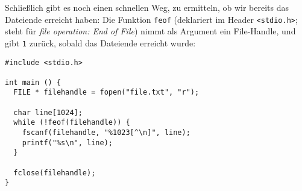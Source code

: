 Schließlich gibt es noch einen schnellen Weg, zu ermitteln, ob wir bereits das Dateiende erreicht haben: Die Funktion \texttt{feof} (deklariert im Header \texttt{<stdio.h>}; steht für \emph{file operation: End of File}) nimmt als Argument ein File-Handle, und gibt \texttt{1} zurück, sobald das Dateiende erreicht wurde:

\begin{codebox}
\begin{verbatim}
#include <stdio.h>

int main () {
  FILE * filehandle = fopen("file.txt", "r");

  char line[1024];
  while (!feof(filehandle)) {
    fscanf(filehandle, "%1023[^\n]", line);
    printf("%s\n", line);
  }

  fclose(filehandle);
}
\end{verbatim}
\end{codebox}

